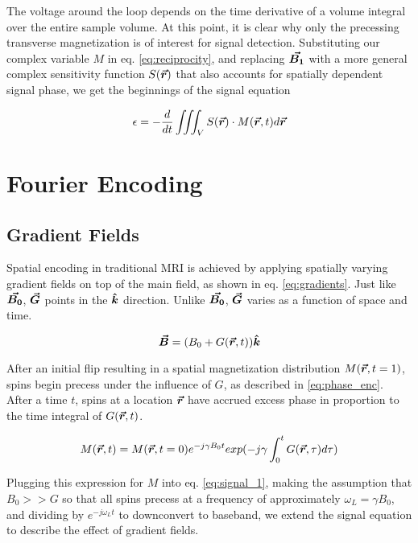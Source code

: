 The voltage around the loop depends on the time derivative of a volume integral over the entire sample volume. At this
point, it is clear why only the precessing transverse magnetization is of interest for signal detection. Substituting
our complex variable $M$ in eq. \ref{eq:reciprocity}, and replacing $\bm{\vec{B_1}}$ with a more general complex sensitivity
function $S(\bm{\vec{r}})$ that also accounts for spatially dependent signal phase, we get the beginnings of the signal
equation

\begin{equation}\label{eq:signal_1}
    \epsilon = -\frac{d}{dt} \iiint_V S(\bm{\vec{r}}) \cdot M(\bm{\vec{r}},t) d\bm{\vec{r}}
\end{equation}

\section{Fourier Encoding}

\subsection{Gradient Fields}
Spatial encoding in traditional MRI is achieved by applying spatially varying gradient fields on top of the main field,
as shown in eq. \ref{eq:gradients}. Just like $\bm{\vec{B_0}}$, $\bm{\vec{G}}$ points in the $\bm{\hat{k}}$ direction. Unlike
$\bm{\vec{B_0}}$, $\bm{\vec{G}}$ varies as a function of space and time.

\begin{equation}\label{eq:gradients}
    \bm{\vec{B}} = (B_0 + G(\bm{\vec{r}},t))\bm{\hat{k}}
\end{equation}

After an initial flip resulting in a spatial magnetization distribution $M(\bm{\vec{r}},t=1)$, spins begin precess under the
influence of $G$, as described in \ref{eq:phase_enc}. After a time $t$, spins at a location $\bm{\vec{r}}$ have accrued
excess phase in proportion to the time integral of $G(\bm{\vec{r}},t)$.

\begin{equation}\label{eq:phase_enc}
    M(\bm{\vec{r}},t) = M(\bm{\vec{r}},t=0) e^{-j \gamma B_0 t} exp(-j \gamma \int_0^t G(\bm{\vec{r}},\tau) d \tau)
\end{equation}

Plugging this expression for $M$ into eq. \ref{eq:signal_1}, making the assumption that $B_0 >> G$ so that all spins
precess at a frequency of approximately $\omega_L = \gamma B_0$, and dividing by $e^{-j \omega_L t}$ to downconvert to
baseband, we extend the signal equation to describe the effect of gradient fields.


